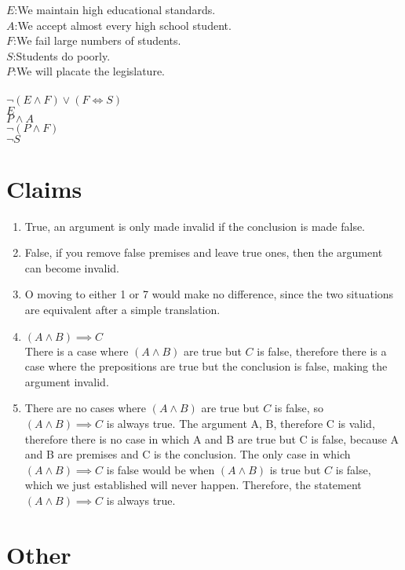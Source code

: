 \documentclass{article}
\begin{document}
\begin{enumerate}
		$E$:We maintain high educational standards.\\
		$A$:We accept almost every high school student.\\
		$F$:We fail large numbers of students.\\
		$S$:Students do poorly.\\
		$P$:We will placate the legislature.\\
		\\
		$\lnot(E \land F)\lor(F \iff S)$\\
		$E$\\
		$P \land A$\\
		\underline{$\lnot (P \land F)$}\\
		$\lnot S$
\end{enumerate}
\section{Claims}
\begin{enumerate}
	\item
		True, an argument is only made invalid if the conclusion is made false.
	\item
		False, if you remove false premises and leave true ones, then the argument can become invalid.
	\item
		O moving to either 1 or 7 would make no difference, since the two situations are equivalent after a simple translation.

	\item
		$(A \land B) \implies C$ \\
		There is a case where $(A \land B)$ are true but $C$ is false, therefore there is a case where the prepositions are true but the conclusion is false, making the argument invalid.\\
	\item
		There are no cases where $(A \land B)$ are true but $C$ is false, so $(A \land B) \implies C$ is always true.
		The argument A, B, therefore C is valid, therefore there is no case in which A and B are true but C is false, because A and B are premises and C is the conclusion. The only case in which $(A \land B)\implies C$ is false would be when $(A \land B)$ is true but $C$ is false, which we just established will never happen. Therefore, the statement $(A \land B) \implies C$ is always true.
\end{enumerate}
\section{Other}
\end{document}
